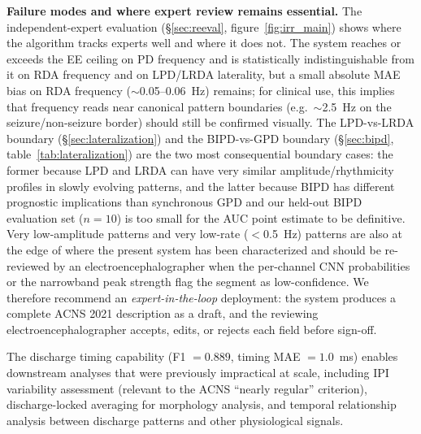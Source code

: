 \documentclass{iopjournal}
\begin{document}
\textbf{Failure modes and where expert review remains essential.} The independent-expert evaluation (\S\ref{sec:reeval}, figure~\ref{fig:irr_main}) shows where the algorithm tracks experts well and where it does not. The system reaches or exceeds the EE ceiling on PD frequency and is statistically indistinguishable from it on RDA frequency and on LPD/LRDA laterality, but a small absolute MAE bias on RDA frequency ($\sim$0.05--0.06~Hz) remains; for clinical use, this implies that frequency reads near canonical pattern boundaries (e.g.\ $\sim$2.5~Hz on the seizure/non-seizure border) should still be confirmed visually. The LPD-vs-LRDA boundary (\S\ref{sec:lateralization}) and the BIPD-vs-GPD boundary (\S\ref{sec:bipd}, table~\ref{tab:lateralization}) are the two most consequential boundary cases: the former because LPD and LRDA can have very similar amplitude/rhythmicity profiles in slowly evolving patterns, and the latter because BIPD has different prognostic implications than synchronous GPD and our held-out BIPD evaluation set ($n=10$) is too small for the AUC point estimate to be definitive. Very low-amplitude patterns and very low-rate ($<$0.5~Hz) patterns are also at the edge of where the present system has been characterized and should be re-reviewed by an electroencephalographer when the per-channel CNN probabilities or the narrowband peak strength flag the segment as low-confidence. We therefore recommend an \emph{expert-in-the-loop} deployment: the system produces a complete ACNS 2021 description as a draft, and the reviewing electroencephalographer accepts, edits, or rejects each field before sign-off.

The discharge timing capability (F1 $= 0.889$, timing MAE $= 1.0$~ms) enables downstream analyses that were previously impractical at scale, including IPI variability assessment (relevant to the ACNS ``nearly regular'' criterion), discharge-locked averaging for morphology analysis, and temporal relationship analysis between discharge patterns and other physiological signals.
\end{document}
